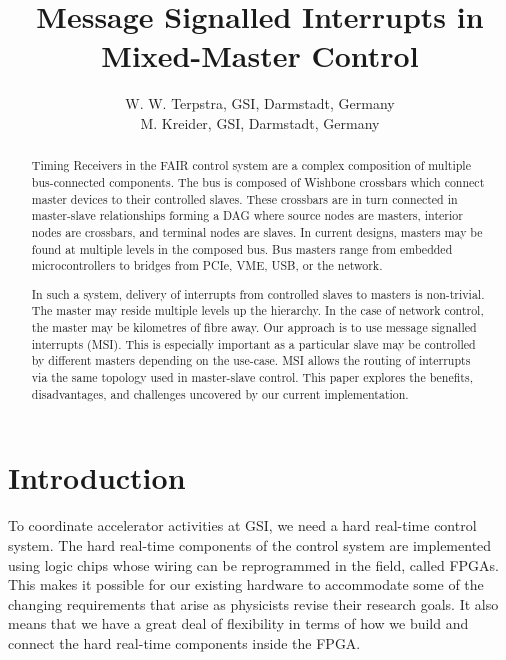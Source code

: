 \documentclass[a4paper]{jacow}
\begin{document}
\title{Message Signalled Interrupts in Mixed-Master Control}

\author{W. W. Terpstra, GSI, Darmstadt, Germany\\
        M. Kreider, GSI, Darmstadt, Germany}
\maketitle

\begin{abstract}

Timing Receivers in the FAIR control system are a complex composition of
multiple bus-connected components. 
The bus is composed of Wishbone crossbars
which connect master devices to their controlled slaves. 
These crossbars are
in turn connected in master-slave relationships forming a DAG where source
nodes are masters, interior nodes are crossbars, and terminal nodes are
slaves. 
In current designs, masters may be found at multiple levels in the
composed bus. 
Bus masters range from embedded microcontrollers to 
bridges from PCIe, VME, USB, or the network. 

In such a
system, delivery of interrupts from controlled slaves to masters is
non-trivial. The master may reside multiple levels up the hierarchy. In the
case of network control, the master may be kilometres of fibre away. Our
approach is to use message signalled interrupts (MSI). This is especially
important as a particular slave may be controlled by different masters
depending on the use-case. MSI allows the routing of interrupts via the same
topology used in master-slave control. This paper explores the benefits,
disadvantages, and challenges uncovered by our current implementation.
\end{abstract}

\section{Introduction}

To coordinate accelerator activities at GSI, we need a hard real-time control system.
The hard real-time components of the control system are implemented using 
logic chips whose wiring can be reprogrammed in the field, called FPGAs.
This makes it possible for our existing hardware to accommodate some of the
changing requirements that arise as physicists revise their research goals.
It also means that we have a great deal of flexibility in terms of how we
build and connect the hard real-time components inside the FPGA.
\end{document}
